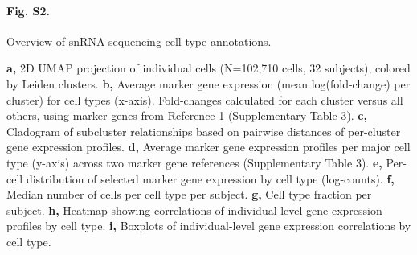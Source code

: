     \paragraph*{Fig. S2.} Overview of snRNA-sequencing cell type annotations.
    \textbf{a,} 2D UMAP projection of individual cells (N=102,710 cells, 32 subjects), colored by Leiden clusters.
    \textbf{b,} Average marker gene expression (mean log(fold-change) per cluster) for cell types (x-axis). Fold-changes calculated for each cluster versus all others, using marker genes from Reference 1 (Supplementary Table 3).
    \textbf{c,} Cladogram of subcluster relationships based on pairwise distances of per-cluster gene expression profiles.
    \textbf{d,} Average marker gene expression profiles per major cell type (y-axis) across two marker gene references (Supplementary Table 3).
    \textbf{e,} Per-cell distribution of selected marker gene expression by cell type (log-counts).
    \textbf{f,} Median number of cells per cell type per subject.
    \textbf{g,} Cell type fraction per subject.
    \textbf{h,} Heatmap showing correlations of individual-level gene expression profiles by cell type.
    \textbf{i,} Boxplots of individual-level gene expression correlations by cell type.
%

